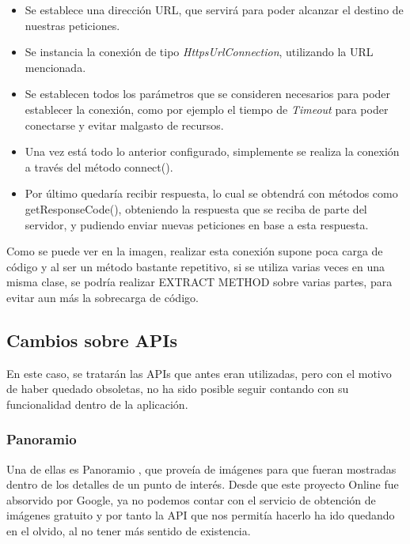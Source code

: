\begin{itemize}
\item Se establece una dirección URL, que servirá para poder alcanzar el destino de nuestras peticiones.
\item Se instancia la conexión de tipo \textit{HttpsUrlConnection}, utilizando la URL mencionada.
\item Se establecen todos los parámetros que se consideren necesarios para poder establecer la conexión, como por ejemplo el tiempo de \textit{Timeout} para poder conectarse y evitar malgasto de recursos.
\item Una vez está todo lo anterior configurado, simplemente se realiza la conexión a través del método connect().
\item Por último quedaría recibir respuesta, lo cual se obtendrá con métodos como getResponseCode(), obteniendo la respuesta que se reciba de parte del servidor, y pudiendo enviar nuevas peticiones en base a esta respuesta.
\end{itemize}


Como se puede ver en la imagen, realizar esta conexión supone poca carga de código y al ser un método bastante repetitivo, si se utiliza varias veces en una misma clase, se podría realizar EXTRACT METHOD sobre varias partes, para evitar aun más la sobrecarga de código.

\subsection{Cambios sobre APIs}

En este caso, se tratarán las APIs que antes eran utilizadas, pero con el motivo de haber quedado obsoletas, no ha sido posible seguir contando con su funcionalidad dentro de la aplicación.

\subsubsection{Panoramio}

Una de ellas es Panoramio \cite{panoramio}, que proveía de imágenes para que fueran mostradas dentro de los detalles de un punto de interés. Desde que este proyecto Online fue absorvido por Google, ya no podemos contar con el servicio de obtención de imágenes gratuito y por tanto la API que nos permitía hacerlo ha ido quedando en el olvido, al no tener más sentido de existencia.

